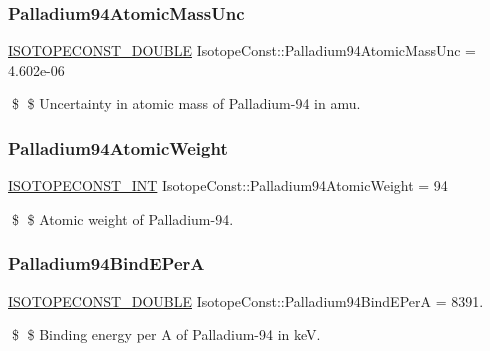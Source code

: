 \subsubsection{\texorpdfstring{Palladium94\+Atomic\+Mass\+Unc}{Palladium94AtomicMassUnc}}
{\footnotesize\ttfamily \mbox{\hyperlink{group___isotope_const-_macros_ga8f45a7272ce02c0b4c65c44636ed719a}{I\+S\+O\+T\+O\+P\+E\+C\+O\+N\+S\+T\+\_\+\+D\+O\+U\+B\+LE}} Isotope\+Const\+::\+Palladium94\+Atomic\+Mass\+Unc = 4.\+602e-\/06}

\$ \$ Uncertainty in atomic mass of Palladium-\/94 in amu. \mbox{\label{group___isotope_const-_palladium-_pd94_gae69d5df8ea511c1e10a37c29296b011c}} 
\subsubsection{\texorpdfstring{Palladium94\+Atomic\+Weight}{Palladium94AtomicWeight}}
{\footnotesize\ttfamily \mbox{\hyperlink{group___isotope_const-_macros_ga5f18360b3e99483a35c32d789e62621c}{I\+S\+O\+T\+O\+P\+E\+C\+O\+N\+S\+T\+\_\+\+I\+NT}} Isotope\+Const\+::\+Palladium94\+Atomic\+Weight = 94}

\$ \$ Atomic weight of Palladium-\/94. \mbox{\label{group___isotope_const-_palladium-_pd94_ga1a38069147a5c946db8422934963a34e}} 
\subsubsection{\texorpdfstring{Palladium94\+Bind\+E\+PerA}{Palladium94BindEPerA}}
{\footnotesize\ttfamily \mbox{\hyperlink{group___isotope_const-_macros_ga8f45a7272ce02c0b4c65c44636ed719a}{I\+S\+O\+T\+O\+P\+E\+C\+O\+N\+S\+T\+\_\+\+D\+O\+U\+B\+LE}} Isotope\+Const\+::\+Palladium94\+Bind\+E\+PerA = 8391.}

\$ \$ Binding energy per A of Palladium-\/94 in keV. \mbox{\label{group___isotope_const-_palladium-_pd94_gabc5d14b15f0208a0a39b57c4b055933b}} 
